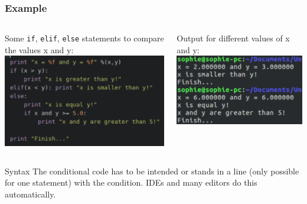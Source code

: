 \documentclass{beamer}
\begin{document}
\begin{frame}
\frametitle{Example}
	\begin{columns}[T]
		\begin{column}[T]{0.6\textwidth}
			Some \texttt{if}, \texttt{elif}, \texttt{else} statements to compare the values x and y:\\
			\includegraphics[width = 1\textwidth]{Comparison.pdf}
		\end{column}
		\begin{column}[T]{0.4\textwidth}
			Output for different values of x and y:\\
			\includegraphics[width = 1\textwidth]{OutputComparison.pdf}	
		\end{column}	
	\end{columns}
	\begin{alertblock} {Syntax} 
		The conditional code has to be intended or stands in a line (only possible for one statement) with the condition. IDEs and many editors do this automatically.
	\end{alertblock}
\end{frame}
\end{document}
